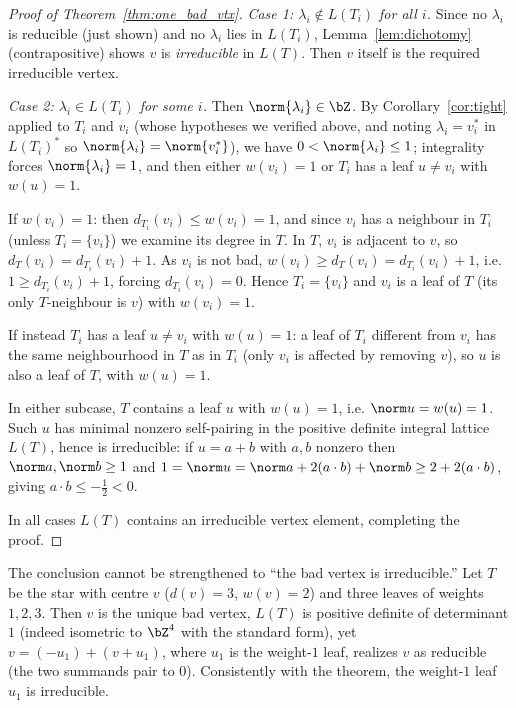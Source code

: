 \begin{proof}[Proof of Theorem~\ref{thm:one_bad_vtx}]
\emph{Case 1: $\lambda_i\notin L(T_i)$ for all $i$.}  Since no $\lambda_i$ is reducible (just
shown) and no $\lambda_i$ lies in $L(T_i)$, Lemma~\ref{lem:dichotomy} (contrapositive) shows
$v$ is \emph{irreducible} in $L(T)$.  Then $v$ itself is the required irreducible vertex.

\emph{Case 2: $\lambda_i\in L(T_i)$ for some $i$.}  Then $\norm{\lambda_i}\in\bZ$.  By
Corollary~\ref{cor:tight} applied to $T_i$ and $v_i$ (whose hypotheses we verified above, and
noting $\lambda_i=v_i^\ast$ in $L(T_i)^\ast$ so $\norm{\lambda_i}=\norm{v_i^\ast}$), we have
$0<\norm{\lambda_i}\le1$; integrality forces $\norm{\lambda_i}=1$, and then either
$w(v_i)=1$ or $T_i$ has a leaf $u\ne v_i$ with $w(u)=1$.

If $w(v_i)=1$: then $d_{T_i}(v_i)\le w(v_i)=1$, and since $v_i$ has a neighbour in $T_i$
(unless $T_i=\{v_i\}$) we examine its degree in $T$.  In $T$, $v_i$ is adjacent to $v$, so
$d_T(v_i)=d_{T_i}(v_i)+1$.  As $v_i$ is not bad, $w(v_i)\ge d_T(v_i)=d_{T_i}(v_i)+1$, i.e.
$1\ge d_{T_i}(v_i)+1$, forcing $d_{T_i}(v_i)=0$.  Hence $T_i=\{v_i\}$ and $v_i$ is a leaf of
$T$ (its only $T$-neighbour is $v$) with $w(v_i)=1$.

If instead $T_i$ has a leaf $u\ne v_i$ with $w(u)=1$: a leaf of $T_i$ different from $v_i$ has
the same neighbourhood in $T$ as in $T_i$ (only $v_i$ is affected by removing $v$), so $u$ is
also a leaf of $T$, with $w(u)=1$.

In either subcase, $T$ contains a leaf $u$ with $w(u)=1$, i.e. $\norm u=w(u)=1$.  Such $u$ has
minimal nonzero self-pairing in the positive definite integral lattice $L(T)$, hence is
irreducible: if $u=a+b$ with $a,b$ nonzero then $\norm a,\norm b\ge1$ and
$1=\norm u=\norm a+2(a\cdot b)+\norm b\ge2+2(a\cdot b)$, giving $a\cdot b\le-\tfrac12<0$.

In all cases $L(T)$ contains an irreducible vertex element, completing the proof.
\end{proof}

\begin{rem}[Sharpness]
The conclusion cannot be strengthened to ``the bad vertex is irreducible.''  Let $T$ be the
star with centre $v$ ($d(v)=3$, $w(v)=2$) and three leaves of weights $1,2,3$.  Then $v$ is
the unique bad vertex, $L(T)$ is positive definite of determinant $1$ (indeed isometric to
$\bZ^4$ with the standard form), yet $v=(-u_1)+(v+u_1)$, where $u_1$ is the weight-$1$ leaf,
realizes $v$ as reducible (the two summands pair to $0$).  Consistently with the theorem, the
weight-$1$ leaf $u_1$ is irreducible.
\end{rem}
